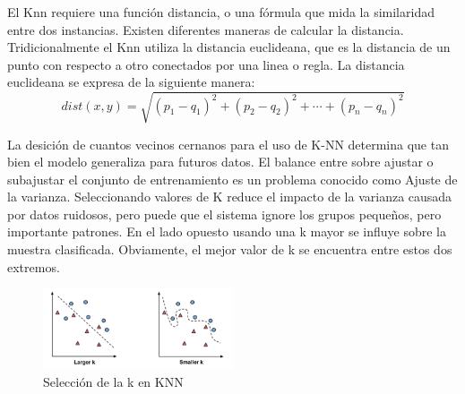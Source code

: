 El Knn requiere una función distancia, o una fórmula que mida la similaridad entre dos instancias. Existen diferentes maneras de calcular la distancia. Tridicionalmente el Knn utiliza la distancia euclideana, que es la distancia de un punto con respecto a otro conectados por una linea o regla. La distancia euclideana se expresa de la siguiente manera:
\begin{equation}
dist(x,y) = \sqrt{(p_1-q_1)^2 + (p_2-q_2)^2+ \cdots + (p_n - q_n)^2}
\end{equation}

La desición de cuantos vecinos cernanos para el uso de K-NN determina que tan bien el modelo generaliza para futuros datos. El balance entre sobre ajustar o subajustar el conjunto de entrenamiento es un problema conocido como Ajuste de la varianza. Seleccionando valores de K reduce el impacto de la varianza causada por datos ruidosos, pero puede que el sistema ignore los grupos pequeños, pero importante patrones. En el lado opuesto usando una k mayor se influye sobre la muestra clasificada. Obviamente, el mejor valor de k se encuentra entre estos dos extremos.
\begin{figure}[h]
\centering
\includegraphics[width=0.5\textwidth]{IMG_0061.png}
\caption{Selección de la k en KNN}
\end{figure}


